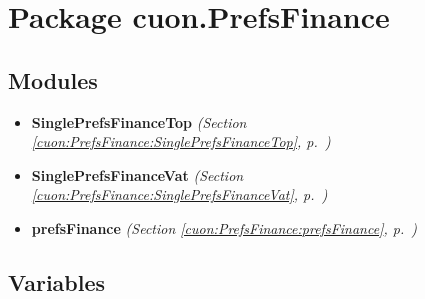 %
%
%


\section{Package cuon.PrefsFinance}

    \label{cuon:PrefsFinance}


\subsection{Modules}

\begin{itemize}
\setlength{\parskip}{0ex}
\item \textbf{SinglePrefsFinanceTop}
  \textit{(Section \ref{cuon:PrefsFinance:SinglePrefsFinanceTop}, p.~\pageref{cuon:PrefsFinance:SinglePrefsFinanceTop})}

\item \textbf{SinglePrefsFinanceVat}
  \textit{(Section \ref{cuon:PrefsFinance:SinglePrefsFinanceVat}, p.~\pageref{cuon:PrefsFinance:SinglePrefsFinanceVat})}

\item \textbf{prefsFinance}
  \textit{(Section \ref{cuon:PrefsFinance:prefsFinance}, p.~\pageref{cuon:PrefsFinance:prefsFinance})}

\end{itemize}



  \subsection{Variables}


